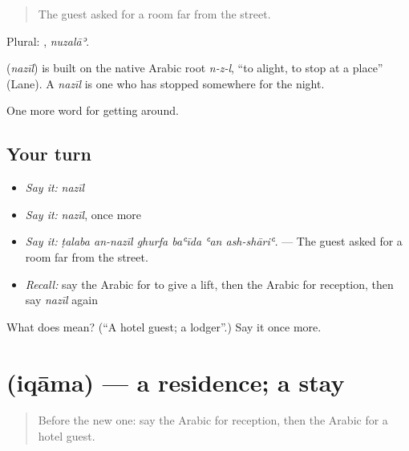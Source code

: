 \begin{quote}
The guest asked for a room far from the street.
\end{quote}

Plural: , \emph{nuzalāʾ}.

\begin{cousinweb}
\textbf{} (\emph{nazīl}) is built on the native Arabic root \emph{n-z-l}, \textquotedblleft{}to alight, to stop at a place\textquotedblright{} (Lane). A \emph{nazīl} is one who has stopped somewhere for the night.
\end{cousinweb}

\begin{grammarlens}[title={What you've built}]
One more word for getting around.
\end{grammarlens}

\subsection*{Your turn}
\begin{itemize}
\raggedright
  \item \emph{Say it:} \emph{nazīl}
  \item \emph{Say it:} \emph{nazīl}, once more
  \item \emph{Say it:} \emph{ṭalaba an-nazīl ghurfa baʿīda ʿan ash-shāriʿ.} — The guest asked for a room far from the street.
  \item \emph{Recall:} say the Arabic for to give a lift, then the Arabic for reception, then say \emph{nazīl} again
\end{itemize}

\begin{tcolorbox}[breakable,colback=teal!4,colframe=teal!35!black,title={Before you move on}]
What does  mean? (\textquotedblleft{}A hotel guest; a lodger\textquotedblright{}.) Say it once more.
\end{tcolorbox}
\section[\texorpdfstring{\ar{إقامة} (iqāma)}{إقامة (iqāma)}]{ (iqāma) — a residence; a stay}

\label{lesson:AR-C441-iqama}



\begin{quote}
Before the new one: say the Arabic for reception, then the Arabic for a hotel guest.
\end{quote}

